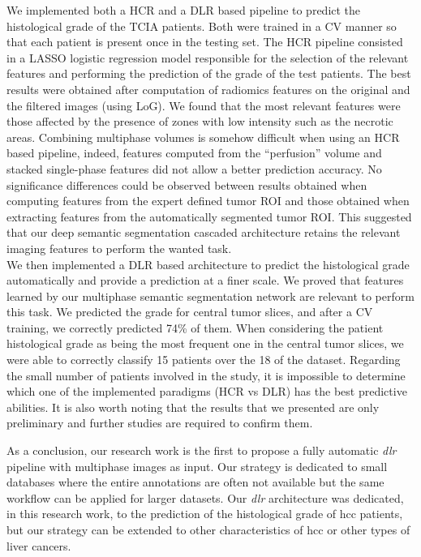 We implemented both a HCR and a DLR based pipeline to predict the histological grade of the TCIA patients. Both were trained in a CV manner so that each patient is present once in the testing set. The HCR pipeline consisted in a LASSO logistic regression model responsible for the selection of the relevant features and performing the prediction of the grade of the test patients. The best results were obtained after computation of radiomics features on the original and the filtered images (using LoG). We found that the most relevant features were those affected by the presence of zones with low intensity such as the necrotic areas. Combining multiphase volumes is somehow difficult when using an HCR based pipeline, indeed, features computed from the ``perfusion'' volume and stacked single-phase features did not allow a better prediction accuracy. No significance differences could be observed between results obtained when computing features from the expert defined tumor ROI and those obtained when extracting features from the automatically segmented tumor ROI. This suggested that our deep semantic segmentation cascaded architecture retains the relevant imaging features to perform the wanted task.\\
We then implemented a DLR based architecture to predict the histological grade automatically and provide a prediction at a finer scale.
We proved that features learned by our multiphase semantic segmentation network are relevant to perform this task.
We predicted the grade for central tumor slices, and after a CV
training, we correctly predicted 74\% of them. When considering the
patient histological grade as being the most frequent one in the central
tumor slices, we were able to correctly classify 15 patients over the 18
of the dataset. Regarding the small number of patients involved in the study, it is impossible to determine which one of the implemented paradigms (HCR vs DLR) has the best predictive abilities. It is also worth noting that the results that we presented are only preliminary and further studies are required to confirm them.

As a conclusion, our research work is the first to propose a fully
automatic \emph{\ac{dlr}} pipeline with multiphase images as input. Our
strategy is dedicated to small databases where the entire annotations
are often not available but the same workflow can be applied for larger
datasets. Our \emph{\ac{dlr}} architecture was dedicated, in this research work, to the prediction of the histological grade of \ac{hcc} patients, but our strategy can be extended to other characteristics of \ac{hcc} or other types of liver cancers.

